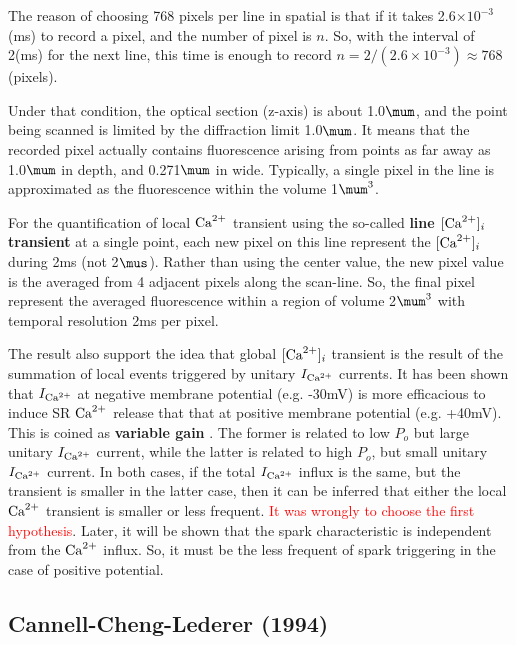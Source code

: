 \begin{framed}
The reason of choosing 768 pixels per line in spatial is that if it takes
2.6$\times 10^{-3}$ (ms) to record a pixel, and the number of pixel is $n$. So,
with the interval of 2(ms) for the next line, this time is enough to record
$n=2/(2.6\times 10^{-3})\approx 768$ (pixels).
\end{framed}

Under that condition, the optical section (z-axis) is about 1.0$\mum$, and the
point being scanned is limited by the diffraction limit 1.0$\mum$. It means
that the recorded pixel actually contains fluorescence arising from points as
far away as 1.0$\mum$ in depth, and 0.271$\mum$ in wide. Typically, a single
pixel in the line is approximated as the fluorescence within the volume
1$\mum^3$.
 
For the quantification of local ${\text{Ca}^{2+}}$ transient using the so-called {\bf line
$[{\text{Ca}^{2+}}]_i$ transient} at a single point, each new pixel on this line represent
the $[{\text{Ca}^{2+}}]_i$ during 2ms (not 2$\mus$). Rather than using the center value, the
new pixel value is the averaged from 4 adjacent pixels along the scan-line.
So, the final pixel represent the averaged fluorescence within a region of
volume 2$\mum^3$ with temporal resolution 2ms per pixel.
 
The result also support the idea that global $[{\text{Ca}^{2+}}]_i$ transient is the result
of the summation of local events triggered by unitary $I_{\text{Ca}^{2+}}$ currents. It has
been shown that $I_{\text{Ca}^{2+}}$ at negative membrane potential (e.g. -30mV) is more
efficacious to induce SR ${\text{Ca}^{2+}}$ release that that at positive membrane potential
(e.g. +40mV).
This is coined as {\bf variable gain} \citep{niggli1990,wier1994lce}. The former
is related to low $P_o$ but large unitary $I_{\text{Ca}^{2+}}$ current, while the latter is
related to high $P_o$, but small unitary $I_{\text{Ca}^{2+}}$ current. In both cases, if the
total $I_{\text{Ca}^{2+}}$ influx is the same, but the transient is smaller in the latter
case, then it can be inferred that either the local ${\text{Ca}^{2+}}$ transient is smaller
or less frequent. \textcolor{red}{It was wrongly to choose the first
hypothesis}. Later, it will be shown that the spark characteristic is
independent from the ${\text{Ca}^{2+}}$ influx. So, it must be the less frequent of spark 
triggering in the case of positive potential.
 

\subsection{Cannell-Cheng-Lederer (1994)}

